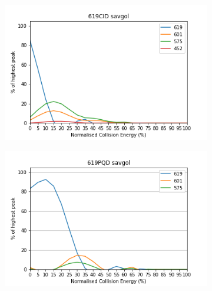 \begin{figure}[!htbp]
  \begin{subfigure}[b]{0.5\textwidth}
    \includegraphics[width=\textwidth]{content/Anhang/ESIMS/Bo-DNCC/619CID-619savgol.png}
    \caption{}
  \end{subfigure}
  \hfill
  \begin{subfigure}[b]{0.5\textwidth}
    \includegraphics[width=\textwidth]{content/Anhang/ESIMS/Bo-DNCC/619PQD-619savgol.png}
    \caption{}
  \end{subfigure}
  

\end{figure}

